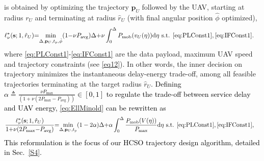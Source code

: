 \documentclass[12pt, draftcls, onecolumn]{IEEEtran}
\theoremstyle{plain}
\theoremstyle{definition}
\theoremstyle{remark}
\newcommand\hlt[1]{\textcolor{black}{#1}}
\begin{document}
is obtained by optimizing the trajectory $\mathbf{p}_{U}$ followed by the UAV, starting at radius $r_U$ and terminating at radius $\hat{r}_{U}$ (with final angular position $\hat\phi$ optimized),
\begin{align}
    \ell_{\nu}^{*}(\mathbf{s};1,\hat{r}_{U}){=}&\underset{\Delta,\mathbf{p}_{U},t_{p},\hat\phi}{\mathrm{min}}(1{-}\nu P_{\mathrm{avg}})\Delta{+}\nu\int_{0}^{\Delta}P_{\mathrm{mob}}(v_U(\eta))\mathrm{d}\eta \text{ s.t.}\;\, \text{\ref{eq:PLConst1}},\text{\ref{eq:IFConst1}}\label{eq:EllMinold}.
\end{align}
where \ref{eq:PLConst1}-\ref{eq:IFConst1} are the data payload, maximum UAV speed and trajectory constraints (see \eqref{eq12}).
 In other words, the inner decision on trajectory minimizes the instantaneous delay-energy trade-off, among all feasible trajectories terminating at the target radius $\hat{r}_{U}$. 
\hlt{Defining $\alpha{\triangleq}\frac{\nu P_{\max}}{(1{+}\nu(2P_{\max}{-}P_{\mathrm{avg}}))} \in [0,1]$ to regulate the trade-off between service delay and UAV energy, \eqref{eq:EllMinold} can be rewritten as
\begin{align}
    \frac{\ell_{\nu}^{*}(\mathbf{s};1,\hat{r}_{U})}{1{+}\nu(2P_{\max}{-} P_{\mathrm{avg}})}{=}&
    \underset{\Delta,\mathbf{p}_{U},t_{p}}{\mathrm{min}}(1-2\alpha)\Delta
    {+}\alpha\int_{0}^{\Delta}
\frac{P_{\mathrm{mob}}(V(\eta))
}{P_{\max}}\mathrm{d}\eta \text{ s.t.}\;\, \text{\ref{eq:PLConst1}},\text{\ref{eq:IFConst1}}\label{eq:EllMin},
\end{align}
This reformulation is the focus of our HCSO trajectory design algorithm, detailed in Sec.~\ref{S4}.}
\end{document}
